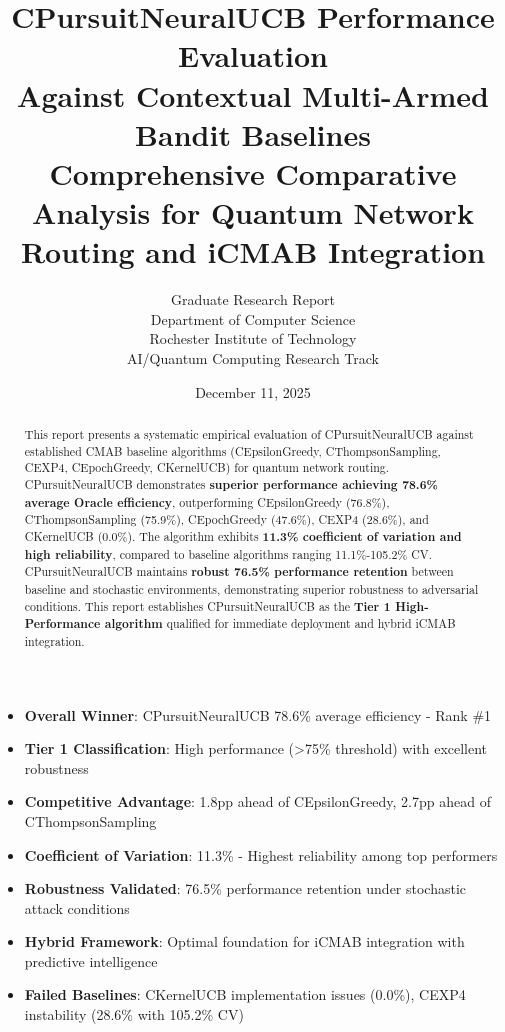 \documentclass[12pt,a4paper]{article}
\title{\textbf{CPursuitNeuralUCB Performance Evaluation\\Against Contextual Multi-Armed Bandit Baselines}\\
\large{Comprehensive Comparative Analysis for Quantum Network Routing and iCMAB Integration}}
\author{Graduate Research Report\\
Department of Computer Science\\
Rochester Institute of Technology\\
AI/Quantum Computing Research Track}
\date{December 11, 2025}
\newcommand{\primarytext}[1]{\textcolor{primaryblue}{\textbf{#1}}}
\newcommand{\secondarytext}[1]{\textcolor{secondaryblue}{\textbf{#1}}}
\newcommand{\success}[1]{\textcolor{accentgreen}{\textbf{#1}}}
\newcommand{\warning}[1]{\textcolor{warningred}{\textbf{#1}}}
\begin{document}
\maketitle

\begin{abstract}
This report presents a systematic empirical evaluation of CPursuitNeuralUCB against established CMAB baseline algorithms (CEpsilonGreedy, CThompsonSampling, CEXP4, CEpochGreedy, CKernelUCB) for quantum network routing. CPursuitNeuralUCB demonstrates \primarytext{superior performance achieving 78.6\% average Oracle efficiency}, outperforming CEpsilonGreedy (76.8\%), CThompsonSampling (75.9\%), CEpochGreedy (47.6\%), CEXP4 (28.6\%), and CKernelUCB (0.0\%). The algorithm exhibits \success{11.3\% coefficient of variation and high reliability}, compared to baseline algorithms ranging 11.1\%-105.2\% CV. CPursuitNeuralUCB maintains \primarytext{robust 76.5\% performance retention} between baseline and stochastic environments, demonstrating superior robustness to adversarial conditions. This report establishes CPursuitNeuralUCB as the \primarytext{Tier 1 High-Performance algorithm} qualified for immediate deployment and hybrid iCMAB integration.
\end{abstract}

\newpage
\vspace{0.5cm}
\tableofcontents

\newpage

\begin{tcolorbox}[colback=highlightgray,colframe=primaryblue,title=\textbf{Executive Summary - CPursuitNeuralUCB Competitive Position}]
\begin{itemize}
\item \primarytext{Overall Winner}: CPursuitNeuralUCB 78.6\% average efficiency - Rank \#1
\item \success{Tier 1 Classification}: High performance (>75\% threshold) with excellent robustness
\item \primarytext{Competitive Advantage}: 1.8pp ahead of CEpsilonGreedy, 2.7pp ahead of CThompsonSampling
\item \secondarytext{Coefficient of Variation}: 11.3\% - Highest reliability among top performers
\item \success{Robustness Validated}: 76.5\% performance retention under stochastic attack conditions
\item \primarytext{Hybrid Framework}: Optimal foundation for iCMAB integration with predictive intelligence
\item \warning{Failed Baselines}: CKernelUCB implementation issues (0.0\%), CEXP4 instability (28.6\% with 105.2\% CV)
\end{itemize}
\end{tcolorbox}
\end{document}
